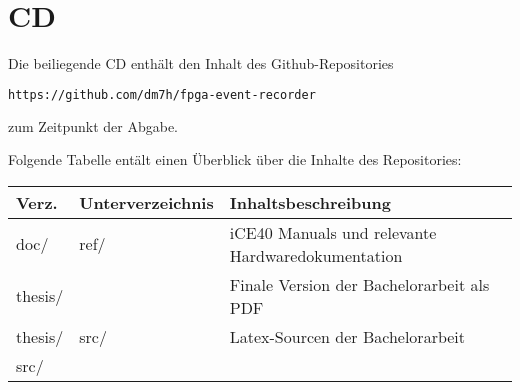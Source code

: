 \section{CD}
Die beiliegende CD enthält den Inhalt des Github-Repositories 
\begin{lstlisting}[language=bash]
https://github.com/dm7h/fpga-event-recorder
\end{lstlisting}
zum Zeitpunkt der Abgabe.

Folgende Tabelle entält einen Überblick über die Inhalte des Repositories:
\begin{table}[h]
\centering

\begin{tabular}{|p{1cm}|p{3cm}|p{10cm}|}
\hline
\rowcolor[HTML]{C0C0C0} 
Verz. & Unterverzeichnis                & Inhaltsbeschreibung                                                                                                                                                                                                                                                                                                      \\ \hline
doc/        & ref/                            & iCE40 Manuals und relevante Hardwaredokumentation                                                                                                                                                                                                                                                                        \\ \hline
thesis/     &                                 & Finale Version der Bachelorarbeit als PDF                                                                                                                                                                                                                                                             \\ \hline
thesis/     & src/                            & Latex-Sourcen der Bachelorarbeit                                                                                                                                                                                                                                                              \\ \hline
src/        &                                 &                                                                                                                                                                                                                                                                                                                          \\ \hline

\end{tabular}
\end{table}
